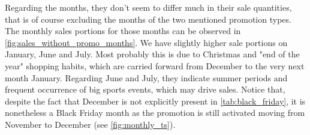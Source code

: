 Regarding the months, they don't seem to differ much in their sale quantities, that is of course excluding the months of the two mentioned promotion types. The monthly sales portions for those months can be observed in \autoref{fig:sales_without_promo_months}. We have slightly higher sale portions on January, June and July. 
Most probably this is due to Christmas and "end of the year" shopping habits, which are carried forward from December to the very next month January. 
Regarding June and July, they indicate summer periods and frequent occurrence of big sports events, which may drive sales. 
Notice that, despite the fact that December is not explicitly present in \autoref{tab:black_friday}, it is nonetheless a Black Friday month as the promotion is still activated moving from November to December (see \autoref{fig:monthly_ts}). 
\\


